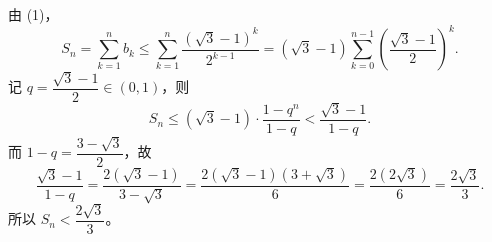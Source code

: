 \begin{answer}

由 (1)，
\nopagebreak[4]
\[
S_n = \sum_{k=1}^{n} b_k \leqslant \sum_{k=1}^{n} \frac{(\sqrt{3}-1)^k}{2^{k-1}} = (\sqrt{3}-1)\sum_{k=0}^{n-1}\left(\frac{\sqrt{3}-1}{2}\right)^{k}.
\]
记 $q = \dfrac{\sqrt{3}-1}{2} \in (0,1)$，则
\nopagebreak[4]
\[
S_n \leqslant (\sqrt{3}-1)\cdot\frac{1-q^n}{1-q} < \frac{\sqrt{3}-1}{1-q}.
\]
而 $1 - q = \dfrac{3-\sqrt{3}}{2}$，故
\nopagebreak[4]
\[
\frac{\sqrt{3}-1}{1-q} = \frac{2(\sqrt{3}-1)}{3-\sqrt{3}} = \frac{2(\sqrt{3}-1)(3+\sqrt{3})}{6} = \frac{2(2\sqrt{3})}{6} = \frac{2\sqrt{3}}{3}.
\]
所以 $S_n < \dfrac{2\sqrt{3}}{3}$。



\end{answer}
